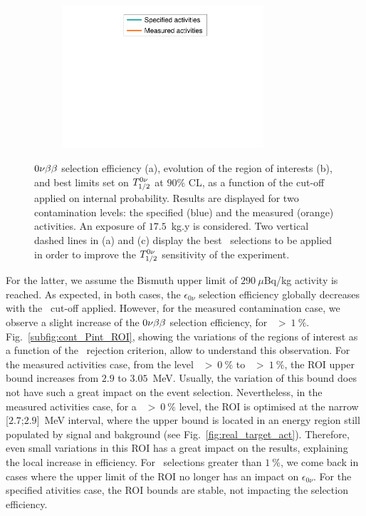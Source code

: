 \begin{figure}[!h]
\begin{subfigure}[t]{0.49\textwidth}
  \captionsetup{justification=justified}
  \caption{
    \label{subfig:cont_Pint_T12}}
\end{subfigure}
\hfill
\begin{subfigure}[t]{0.49\textwidth}
  \centering
  \includegraphics[width=0.82\textwidth]{Sensitivity/fig_sensitivity/legend_cut_Pint.pdf}
  \end{subfigure}
\caption{$0\nu\beta\beta$ selection efficiency (a),
  evolution of the region of interests (b),
  and best limits set on $T_{1/2}^{0\nu}$ at $90\%$ CL, as a function of the cut-off applied on internal probability.
  Results are displayed for two contamination levels: the specified (blue) and the measured (orange) activities.
  An exposure of $17.5$~kg.y is considered.
  Two vertical dashed lines in (a) and (c) display the best \Pint\ selections to be applied in order to improve the $T_{1/2}^{0\nu}$ sensitivity of the experiment.
  \label{fig:cont_Pint}}
\end{figure}
For the latter, we assume the Bismuth upper limit of $290~\mu$Bq/kg activity is reached.
As expected, in both cases, the $\epsilon_{0\nu}$ selection efficiency globally decreases with the \Pint\ cut-off applied.
However, for the measured contamination case, we observe a slight increase of the $0\nu\beta\beta$ selection efficiency, for \Pint\ $>~1~\%$.
Fig.~\ref{subfig:cont_Pint_ROI}, showing the variations of the regions of interest as a function of the \Pint\ rejection criterion, allow to understand this observation.
For the measured activities case, from the level \Pint~$>~0~\%$ to \Pint~$>~1~\%$, the ROI upper bound increases from $2.9$ to $3.05$~MeV.
Usually, the variation of this bound does not have such a great impact on the event selection.
Nevertheless, in the measured activities case, for a \Pint~$>~0~\%$ level, the ROI is optimised at the narrow [$2.7$;$2.9$]~MeV interval, where the upper bound is located in an energy region still populated by signal and bakground (see Fig.~\ref{fig:real_target_act}).
Therefore, even small variations in this ROI has a great impact on the results, explaining the local increase in efficiency.
For \Pint\ selections greater than $1~\%$, we come back in cases where the upper limit of the ROI no longer has an impact on $\epsilon_{0\nu}$.
For the specified ativities case, the ROI bounds are stable, not impacting the selection efficiency.

